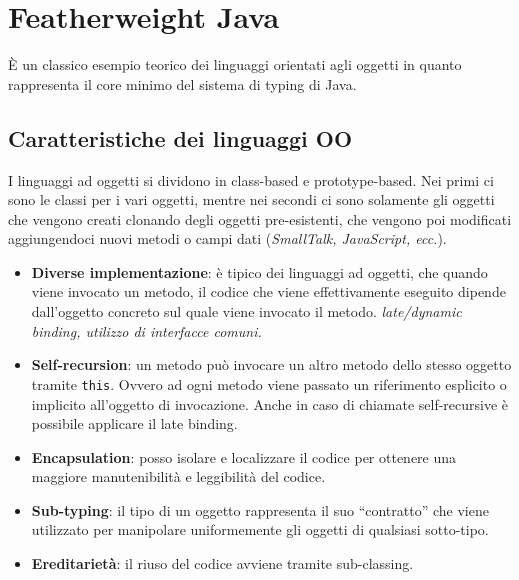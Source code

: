

\chapter{Featherweight Java}

\`E un classico esempio teorico dei linguaggi orientati agli oggetti in quanto rappresenta il core minimo del sistema di typing di Java.

\section{Caratteristiche dei linguaggi OO}

I linguaggi ad oggetti si dividono in class-based e prototype-based. Nei primi ci sono le classi per i vari oggetti, mentre nei secondi ci sono solamente gli oggetti che vengono creati clonando degli oggetti pre-esistenti, che vengono poi modificati aggiungendoci nuovi metodi o campi dati (\textit{SmallTalk, JavaScript, ecc.}).

\begin{itemize}
	\item \textbf{Diverse implementazione}: è tipico dei linguaggi ad oggetti, che quando viene invocato un metodo, il codice che viene effettivamente eseguito dipende dall'oggetto concreto sul quale viene invocato il metodo. \textit{late/dynamic binding, utilizzo di interfacce comuni.} 
	\item \textbf{Self-recursion}: un metodo può invocare un altro metodo dello stesso oggetto tramite \texttt{this}. Ovvero ad ogni metodo viene passato un riferimento esplicito o implicito all'oggetto di invocazione. Anche in caso di chiamate self-recursive è possibile applicare il late binding.
	\item \textbf{Encapsulation}: posso isolare e localizzare il codice per ottenere una maggiore manutenibilità e leggibilità del codice.
	\item \textbf{Sub-typing}: il tipo di un oggetto rappresenta il suo ``contratto'' che viene utilizzato per manipolare uniformemente gli oggetti di qualsiasi sotto-tipo.
	\item \textbf{Ereditarietà}: il riuso del codice avviene tramite sub-classing.
\end{itemize}

